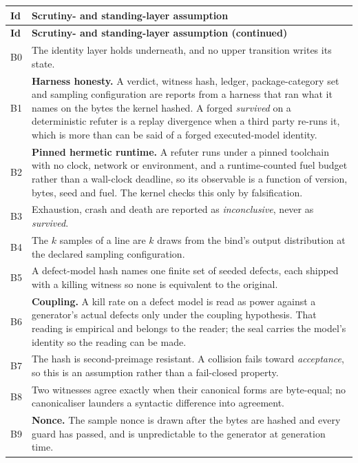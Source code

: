 \documentclass[11pt,a4paper]{article}
\theoremstyle{plain}
\theoremstyle{definition}
\theoremstyle{remark}
\begin{document}
\begin{longtable}{@{}p{}p{}@{}}
\toprule
\textbf{Id} & \textbf{Scrutiny- and standing-layer assumption} \\
\midrule
\endfirsthead
\toprule
\textbf{Id} & \textbf{Scrutiny- and standing-layer assumption (continued)} \\
\midrule
\endhead
B0 & The identity layer holds underneath, and no upper transition writes its state. \\
B1 & \textbf{Harness honesty.} A verdict, witness hash, ledger, package-category set and sampling configuration are reports from a harness that ran what it names on the bytes the kernel hashed. A forged \emph{survived} on a deterministic refuter is a replay divergence when a third party re-runs it, which is more than can be said of a forged executed-model identity. \\
B2 & \textbf{Pinned hermetic runtime.} A refuter runs under a pinned toolchain with no clock, network or environment, and a runtime-counted fuel budget rather than a wall-clock deadline, so its observable is a function of version, bytes, seed and fuel. The kernel checks this only by falsification. \\
B3 & Exhaustion, crash and death are reported as \emph{inconclusive}, never as \emph{survived}. \\
B4 & The $k$ samples of a line are $k$ draws from the bind's output distribution at the declared sampling configuration. \\
B5 & A defect-model hash names one finite set of seeded defects, each shipped with a killing witness so none is equivalent to the original. \\
B6 & \textbf{Coupling.} A kill rate on a defect model is read as power against a generator's actual defects only under the coupling hypothesis. That reading is empirical and belongs to the reader; the seal carries the model's identity so the reading can be made. \\
B7 & The hash is second-preimage resistant. A collision fails toward \emph{acceptance}, so this is an assumption rather than a fail-closed property. \\
B8 & Two witnesses agree exactly when their canonical forms are byte-equal; no canonicaliser launders a syntactic difference into agreement. \\
B9 & \textbf{Nonce.} The sample nonce is drawn after the bytes are hashed and every guard has passed, and is unpredictable to the generator at generation time. \\

\end{longtable}
\end{document}
